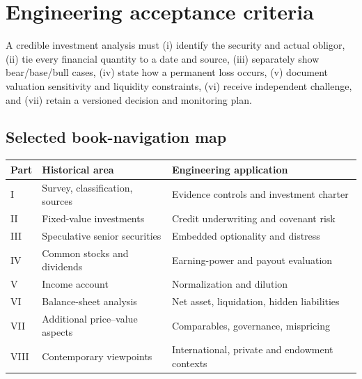 \documentclass[11pt,letterpaper]{article}
\begin{document}
\section{Engineering acceptance criteria}
A credible investment analysis must (i) identify the security and actual obligor, (ii) tie every financial quantity to a date and source, (iii) separately show bear/base/bull cases, (iv) state how a permanent loss occurs, (v) document valuation sensitivity and liquidity constraints, (vi) receive independent challenge, and (vii) retain a versioned decision and monitoring plan.

\subsection{Selected book-navigation map}
\begin{center}\small\begin{tabularx}{\textwidth}{p{}X X}\toprule Part & Historical area & Engineering application \\
\midrule
I & Survey, classification, sources & Evidence controls and investment charter \\
II & Fixed-value investments & Credit underwriting and covenant risk \\
III & Speculative senior securities & Embedded optionality and distress \\
IV & Common stocks and dividends & Earning-power and payout evaluation \\
V & Income account & Normalization and dilution \\
VI & Balance-sheet analysis & Net asset, liquidation, hidden liabilities \\
VII & Additional price--value aspects & Comparables, governance, mispricing \\
VIII & Contemporary viewpoints & International, private and endowment contexts \\
\bottomrule\end{tabularx}\end{center}
\end{document}
